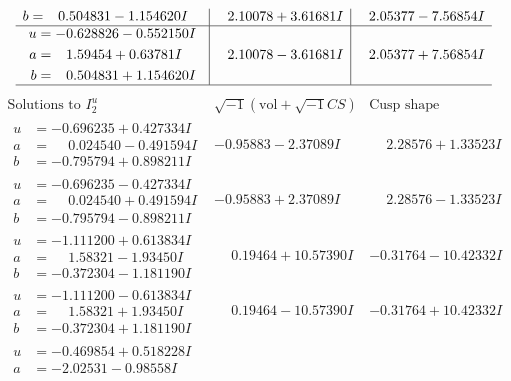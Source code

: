 \documentclass[1p]{elsarticle_modified}
\theoremstyle{definition}
\newcommand{\I}{\sqrt{-1}}
\begin{document}
$$\begin{array}{c|c|c}
\begin{aligned}
b &= \phantom{-}0.504831 - 1.154620 I\end{aligned}
 & \phantom{-}2.10078 + 3.61681 I & \phantom{-}2.05377 - 7.56854 I \\ \hline\begin{aligned}
u &= -0.628826 - 0.552150 I \\
a &= \phantom{-}1.59454 + 0.63781 I \\
b &= \phantom{-}0.504831 + 1.154620 I\end{aligned}
 & \phantom{-}2.10078 - 3.61681 I & \phantom{-}2.05377 + 7.56854 I\\
 \hline 
 \end{array}$$\newpage$$\begin{array}{c|c|c}  
\text{Solutions to }I^u_{2}& \I (\text{vol} + \sqrt{-1}CS) & \text{Cusp shape}\\
 \hline 
\begin{aligned}
u &= -0.696235 + 0.427334 I \\
a &= \phantom{-}0.024540 - 0.491594 I \\
b &= -0.795794 + 0.898211 I\end{aligned}
 & -0.95883 - 2.37089 I & \phantom{-}2.28576 + 1.33523 I \\ \hline\begin{aligned}
u &= -0.696235 - 0.427334 I \\
a &= \phantom{-}0.024540 + 0.491594 I \\
b &= -0.795794 - 0.898211 I\end{aligned}
 & -0.95883 + 2.37089 I & \phantom{-}2.28576 - 1.33523 I \\ \hline\begin{aligned}
u &= -1.111200 + 0.613834 I \\
a &= \phantom{-}1.58321 - 1.93450 I \\
b &= -0.372304 - 1.181190 I\end{aligned}
 & \phantom{-}0.19464 + 10.57390 I & -0.31764 - 10.42332 I \\ \hline\begin{aligned}
u &= -1.111200 - 0.613834 I \\
a &= \phantom{-}1.58321 + 1.93450 I \\
b &= -0.372304 + 1.181190 I\end{aligned}
 & \phantom{-}0.19464 - 10.57390 I & -0.31764 + 10.42332 I \\ \hline\begin{aligned}
u &= -0.469854 + 0.518228 I \\
a &= -2.02531 - 0.98558 I \\

\end{aligned}
\end{array}$$
\end{document}
